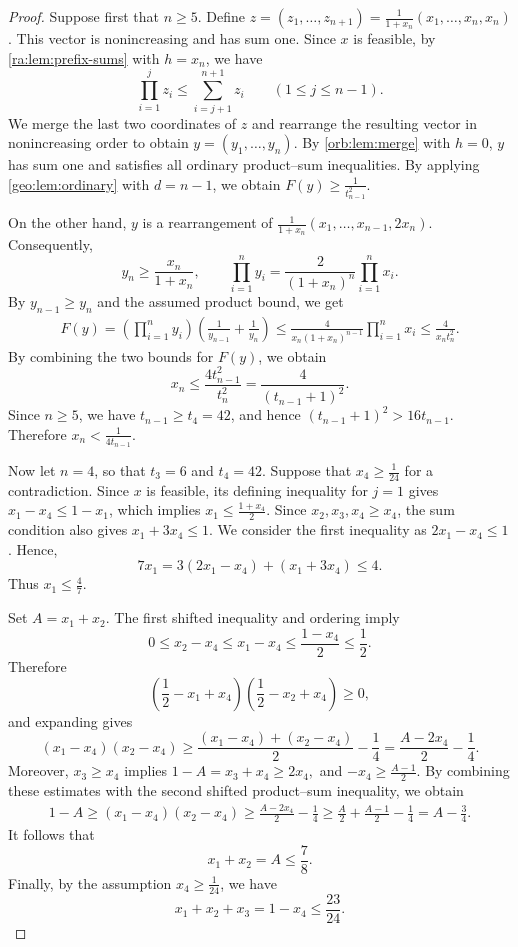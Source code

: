 \documentclass[reqno, 11pt]{article}
\numberwithin{equation}{section}
\theoremstyle{definition}
\begin{document}
\begin{proof}
Suppose first that $n\ge5$.
Define
$z=(z_1,\ldots,z_{n+1})=\frac{1}{1+x_n}(x_1,\ldots,x_n,x_n)$.
This vector is nonincreasing and has sum one.
Since $x$ is feasible, by \cref{ra:lem:prefix-sums} with $h=x_n$, we have
\[
\prod_{i=1}^{j}z_i
\le\sum_{i=j+1}^{n+1}z_i
\qquad (1\le j\le n-1).
\]
We merge the last two coordinates of $z$ and rearrange the resulting vector in nonincreasing order to obtain $y=(y_1,\ldots,y_n)$.
By \cref{orb:lem:merge} with $h=0$, $y$ has sum one and
satisfies all ordinary product--sum inequalities.
By applying \cref{geo:lem:ordinary} with $d=n-1$, we obtain
$F(y)\ge\frac1{t_{n-1}^2}$.

On the other hand, $y$ is a rearrangement of
$
\frac{1}{1+x_n}(x_1,\ldots,x_{n-1},2x_n).
$
Consequently,
\[
y_n\ge\frac{x_n}{1+x_n},
\qquad
\prod_{i=1}^{n}y_i
=\frac{2}{(1+x_n)^n}\prod_{i=1}^{n}x_i.
\]
By $y_{n-1}\ge y_n$ and the assumed product bound, we get
\[
\begin{aligned}
F(y)
=\left(\prod_{i=1}^{n}y_i\right)
  \left(\frac1{y_{n-1}}+\frac1{y_n}\right)\le\frac{4}{x_n(1+x_n)^{n-1}}
     \prod_{i=1}^{n}x_i\le\frac{4}{x_n t_n^2}.
\end{aligned}
\]
By combining the two bounds for $F(y)$, we obtain 
\[
x_n\le\frac{4t_{n-1}^2}{t_n^2}
=\frac{4}{(t_{n-1}+1)^2}.
\]
Since $n\ge5$, we have $t_{n-1}\ge t_4=42$, and hence
$(t_{n-1}+1)^2>16t_{n-1}$.
Therefore $x_n<\frac{1}{4t_{n-1}}$.

Now let $n=4$, so that $t_3=6$ and $t_4=42$.
Suppose that $x_4\ge\frac{1}{24}$ for a contradiction.
Since $x$ is feasible, its defining inequality for $j=1$ gives $x_1-x_4\le1-x_1$, which implies $ x_1\le \frac{1+x_4}{2}.$
Since $x_2,x_3,x_4\ge x_4$, the sum condition also gives $x_1+3x_4\le1.$
We consider the first inequality as $2x_1-x_4\le1$. Hence, 
\[
 7x_1=3(2x_1-x_4)+(x_1+3x_4)\le4.
\]
Thus $x_1\le\frac{4}{7}$.

Set $A=x_1+x_2$. The first shifted inequality and ordering imply
\[
 0\le x_2-x_4 \le x_1-x_4
 \le\frac{1-x_4}{2}
 \le\frac12.
\]
Therefore
\[
 \left(\frac12-x_1+x_4\right)
 \left(\frac12-x_2+x_4\right)\ge0,
\]
and expanding gives
\[
 (x_1-x_4)(x_2-x_4)
 \ge\frac{(x_1-x_4)+(x_2-x_4)}{2}-\frac14
 =\frac{A-2x_4}{2}-\frac14.
\]
Moreover, $x_3\ge x_4$ implies
$1-A=x_3+x_4\ge2 x_4,$ and $-x_4\ge\frac{A-1}{2}$.
By combining these estimates with the second shifted
product--sum inequality, we obtain
\begin{align*}
 1-A
 \ge(x_1-x_4)(x_2-x_4)\ge\frac{A-2x_4}{2}-\frac14\ge\frac A2+\frac{A-1}{2}-\frac14
  =A-\frac34.
\end{align*}
It follows that
$$
 x_1+x_2=A\le\frac78.
$$
Finally, by the assumption $x_4\ge\frac{1}{24}$, we have
$$
 x_1+x_2+x_3=1-x_4\le\frac{23}{24}.
$$


\end{proof}
\end{document}
